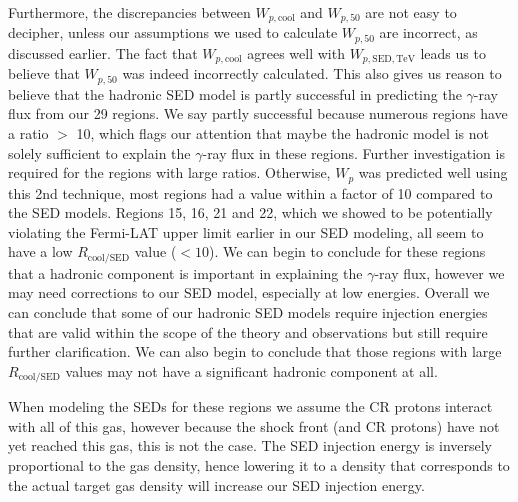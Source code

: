 \documentclass[12pt,a4paper]{article}
\begin{document}
Furthermore, the discrepancies between $W_{p,\mathrm{cool}}$ and $W_{p,50}$ are not easy to decipher, unless our assumptions we used to calculate $W_{p,50}$ are incorrect, as discussed earlier. The fact that $W_{p,\mathrm{cool}}$ agrees well with $W_{p,\mathrm{SED}, \mathrm{TeV}}$ leads us to believe that $W_{p,50}$ was indeed incorrectly calculated. This also gives us reason to believe that the hadronic SED model is partly successful in predicting the $\gamma$-ray flux from our 29 regions. We say partly successful because numerous regions have a ratio $>$ 10, which flags our attention that maybe the hadronic model is not solely sufficient to explain the $\gamma$-ray flux in these regions. Further investigation is required for the regions with large ratios. Otherwise, $W_p$ was predicted well using this 2nd technique, most regions had a value within a factor of 10 compared to the SED models. Regions 15, 16, 21 and 22, which we showed to be potentially violating the Fermi-LAT upper limit earlier in our SED modeling, all seem to have a low $R_{\mathrm{cool/SED}}$ value ($< 10$). We can begin to conclude for these regions that a hadronic component is important in explaining the $\gamma$-ray flux, however we may need corrections to our SED model, especially at low energies. Overall we can conclude that some of our hadronic SED models require injection energies that are valid within the scope of the theory and observations but still require further clarification. We can also begin to conclude that those regions with large $R_{\mathrm{cool/SED}}$ values may not have a significant hadronic component at all.

 
When modeling the SEDs for these regions we assume the CR protons interact with all of this gas, however because the shock front (and CR protons) have not yet reached this gas, this is not the case. The SED injection energy is inversely proportional to the gas density, hence lowering it to a density that corresponds to the actual target gas density will increase our SED injection energy. 
\end{document}
